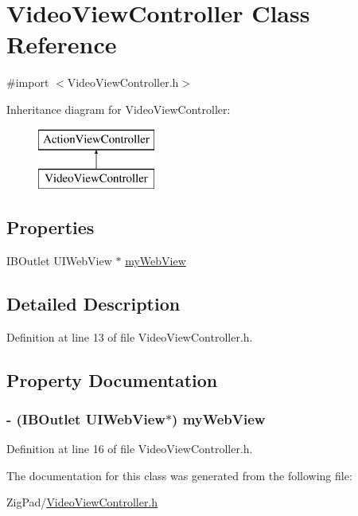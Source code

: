 \hypertarget{interface_video_view_controller}{
\section{VideoViewController Class Reference}
\label{interface_video_view_controller}
}


{\ttfamily \#import $<$VideoViewController.h$>$}

Inheritance diagram for VideoViewController:\begin{figure}[H]
\begin{center}
\leavevmode
\includegraphics[height=2.000000cm]{interface_video_view_controller}
\end{center}
\end{figure}
\subsection*{Properties}
\begin{DoxyCompactItemize}
\item 
IBOutlet UIWebView $\ast$ \hyperlink{interface_video_view_controller_a9527d1e82d0094024e571c7e2e6ef741}{myWebView}
\end{DoxyCompactItemize}


\subsection{Detailed Description}


Definition at line 13 of file VideoViewController.h.



\subsection{Property Documentation}
\hypertarget{interface_video_view_controller_a9527d1e82d0094024e571c7e2e6ef741}{
\subsubsection[{myWebView}]{\setlength{\rightskip}{0pt plus 5cm}-\/ (IBOutlet UIWebView$\ast$) myWebView}}
\label{interface_video_view_controller_a9527d1e82d0094024e571c7e2e6ef741}


Definition at line 16 of file VideoViewController.h.



The documentation for this class was generated from the following file:\begin{DoxyCompactItemize}
\item 
ZigPad/\hyperlink{_video_view_controller_8h}{VideoViewController.h}\end{DoxyCompactItemize}
